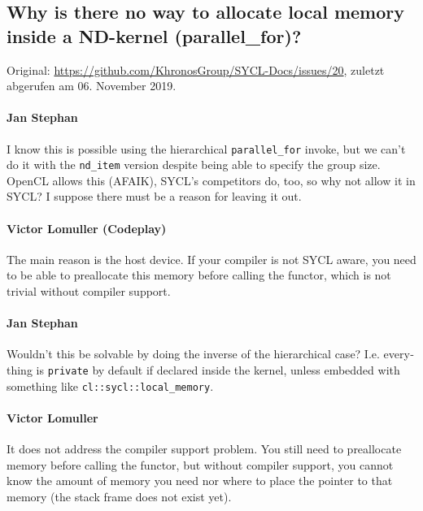 \subsection{Why is there no way to allocate local memory inside a ND-kernel
            (parallel\_for)?}\label{anhang:diskussionen:syclspec:staticshared}

Original: \url{https://github.com/KhronosGroup/SYCL-Docs/issues/20}, zuletzt
abgerufen am 06. November 2019.

\begin{otherlanguage}{english}
    \paragraph{Jan Stephan} I know this is possible using the hierarchical
                            \texttt{parallel\_for} invoke, but we can't do it
                            with the \texttt{nd\_item} version despite being
                            able to specify the group size. OpenCL allows this
                            (AFAIK), SYCL's competitors do, too, so why not
                            allow it in SYCL? I suppose there must be a reason
                            for leaving it out.
    \paragraph{Victor Lomuller (Codeplay)} The main reason is the host device.
                            If your compiler is not SYCL aware, you need to be
                            able to preallocate this memory before calling the
                            functor, which is not trivial without compiler
                            support.
    \paragraph{Jan Stephan} Wouldn't this be solvable by doing the inverse of
                            the hierarchical case? I.e. everything is
                            \texttt{private} by default if declared inside the
                            kernel, unless embedded with something like
                            \texttt{cl::sycl::local\_memory}.
    \paragraph{Victor Lomuller} It does not address the compiler support
                                problem. You still need to preallocate memory
                                before calling the functor, but without compiler
                                support, you cannot know the amount of memory
                                you need nor where to place the pointer to that
                                memory (the stack frame does not exist yet).

\end{otherlanguage}
